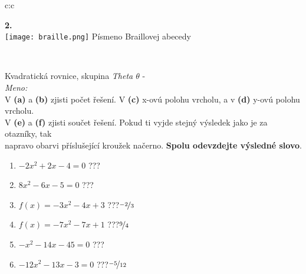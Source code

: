 \documentclass[10pt]{report}
\begin{document}
\begin{tabular}{c:c}
\begin{minipage}[c][99mm][t]{0.49\linewidth}
\begin{center}
\begin{minipage}{0.20\linewidth}
\begin{center}
{\Huge\bfseries 2.} \\[2mm]
\texttt{[image: braille.png]}
{\small Písmeno Braillovej abecedy}
\end{center}
\end{minipage}
\end{center}
\end{minipage}
\\ \hdashline
\begin{minipage}[c][99mm][t]{0.49\linewidth}
\begin{center}
\vspace{7mm}
{\huge Kvadratická rovnice, skupina \textit{Theta $\theta$} -}\\[4.5mm]
\textit{Meno:}\phantom{xxxxxxxxxxxxxxxxxxxxxxxxxxxxxxxxxxxxxxxxxxxxxxxxxxxxxxxxxxxxxxxxx}\\[3.5mm]
V \textbf{(a)} a \textbf{(b)} zjisti počet řešení. V \textbf{(c)} x-ovú polohu vrcholu, a v \textbf{(d)} y-ovú polohu vrcholu.\\V \textbf{(e)} a \textbf{(f)} zjisti součet řešení. Pokud ti vyjde stejný výsledek jako je za otazníky, tak\\napravo obarvi příslušející kroužek načerno. \textbf{Spolu odevzdejte výsledné slovo}.\\[3mm]
\begin{minipage}{0.77\linewidth}
\begin{center}
\begin{varwidth}{\textwidth}
\begin{enumerate}
\large
\item $-2x^2+2x-4=0$\quad \dotfill\; ???\;\dotfill {}
\item $8x^2-6x-5=0$\quad \dotfill\; ???\;\dotfill {}
\item $f(x)=-3x^2-4x+3$\quad \dotfill\; ???\;\dotfill \quad $\nicefrac{-2}{3}$
\item $f(x)=-7x^2-7x+1$\quad \dotfill\; ???\;\dotfill \quad $\nicefrac{9}{4}$
\item $-x^2-14x-45=0$\quad \dotfill\; ???\;\dotfill {}
\item $-12x^2-13x-3=0$\quad \dotfill\; ???\;\dotfill \quad $\nicefrac{-5}{12}$
\end{enumerate}
\end{varwidth}
\end{center}
\end{minipage}
\begin{minipage}{0.20\linewidth}
\begin{center}

\end{center}
\end{minipage}
\end{center}
\end{minipage}
\end{tabular}
\end{document}
